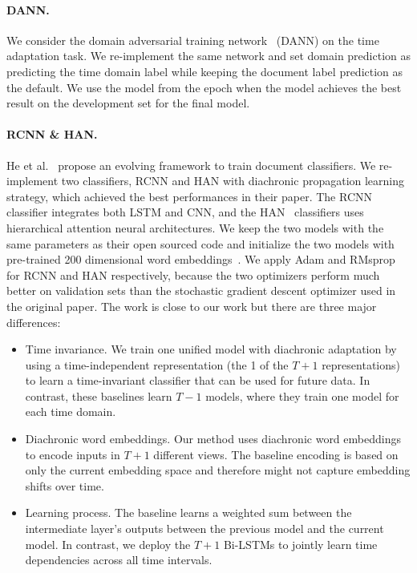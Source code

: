 \paragraph{DANN.} We consider the domain adversarial training network~\cite{ganin2016domain} (DANN) on the time adaptation task. We re-implement the same network and set domain prediction as predicting the time domain label while keeping the document label prediction as the default. We use the model from the epoch when the model achieves the best result on the development set for the final model.

\paragraph{RCNN \& HAN.} He et al.~\cite{he2018time} propose an evolving framework to train document classifiers. We re-implement two classifiers, RCNN and HAN with diachronic propagation learning strategy, which achieved the best performances in their paper. The RCNN~\cite{lai2015recurrent} classifier integrates both LSTM and CNN, and the HAN~\cite{yang2016hierarchical} classifiers uses hierarchical attention neural architectures. We keep the two models with the same parameters as their open sourced code and initialize the two models with pre-trained 200 dimensional word embeddings~\cite{bojanowski2017enriching}. We apply Adam and RMsprop for RCNN and HAN respectively, because the two optimizers perform much better on validation sets than the stochastic gradient descent optimizer used in the original paper. The work is close to our work but there are three major differences:
\begin{itemize}
    \item Time invariance. We train one unified model with diachronic adaptation by using a time-independent representation (the 1 of the $T+1$ representations) to learn a time-invariant classifier that can be used for future data. In contrast, these baselines learn $T-1$ models, where they train one model for each time domain.
    \item Diachronic word embeddings. Our method uses diachronic word embeddings to encode inputs in $T+1$ different views. The baseline encoding is based on only the current embedding space and therefore might not capture embedding shifts over time.
    \item Learning process. The baseline learns a weighted sum between the intermediate layer's outputs between the previous model and the current model. In contrast, we deploy the $T+1$ Bi-LSTMs to jointly learn time dependencies across all time intervals. %
\end{itemize} 

